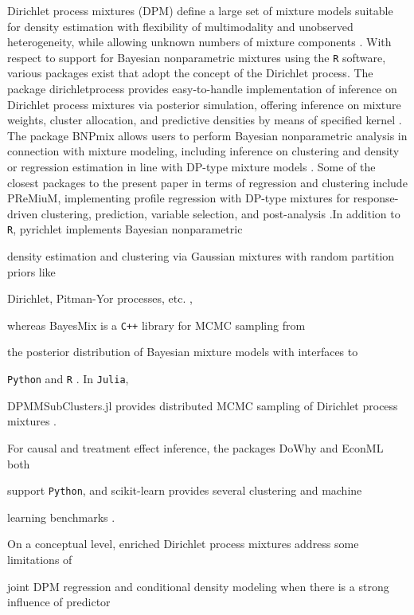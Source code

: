 \documentclass[11pt]{article}\usepackage[]{graphicx}\usepackage[]{xcolor}
\newcommand{\pkg}[1]{\textsf{#1}}
\newcommand{\proglang}[1]{\texttt{#1}}
\begin{document}
Dirichlet process mixtures (DPM) define a large set of mixture
models suitable for density estimation with flexibility of multimodality
and unobserved heterogeneity, while allowing unknown numbers of mixture
components \citep{EscobarWest1995}. With respect to support for
Bayesian nonparametric mixtures using the \proglang{R} software, various
packages exist that adopt the concept of the Dirichlet process.
The package \pkg{dirichletprocess}
provides easy-to-handle implementation of inference on Dirichlet process
mixtures via posterior simulation, offering inference on mixture weights,
cluster allocation, and predictive densities by means of specified kernel
\citep{dirichletprocess_pkg}.
The package \pkg{BNPmix}
allows users to perform Bayesian nonparametric analysis in connection with
mixture modeling, including inference on clustering and density or
regression estimation in line with DP-type mixture models
\citep{canale2021BNPmix}.
Some of the closest packages to the present paper in terms of regression
and clustering include \pkg{PReMiuM}, implementing profile regression with
DP-type mixtures for response-driven clustering, prediction, variable
selection, and post-analysis \citep{PReMiuM_pkg}.In addition to \proglang{R}, \pkg{pyrichlet} implements Bayesian nonparametric

density estimation and clustering via Gaussian mixtures with random partition priors like

Dirichlet, Pitman-Yor processes, etc. \citep{pyrichlet_pkg},

whereas \pkg{BayesMix} is a \proglang{C++} library for MCMC sampling from

the posterior distribution of Bayesian mixture models with interfaces to

\proglang{Python} and \proglang{R} \citep{BayesMix_pkg}. In \proglang{Julia},

\pkg{DPMMSubClusters.jl} provides distributed MCMC sampling of Dirichlet process mixtures \citep{DPMMSubClustersjl_pkg}.

For causal and treatment effect inference, the packages \pkg{DoWhy} and \pkg{EconML} both

support \proglang{Python}, and \pkg{scikit-learn} provides several clustering and machine

learning benchmarks \citep{dowhy_pkg,econml_pkg,scikit_learn}.

On a conceptual level, enriched Dirichlet process mixtures address some limitations of

joint DPM regression and conditional density modeling when there is a strong influence of predictor
\end{document}
